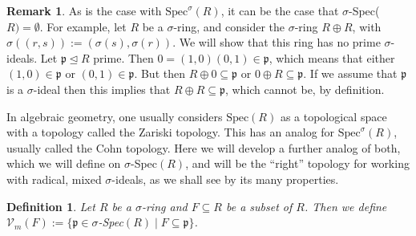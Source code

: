\documentclass{article}
\def\I{\mathbb{I}}
\def\Vm{\mathcal{V}_m}
\def\p{\mathfrak{p}}
\def\s{\sigma}
\def\Spec{\text{Spec}}
\theoremstyle{plain}
\newtheorem{defn}[Satz]{Definition}
\theoremstyle{definition}
\newtheorem{rem}[Satz]{Remark}
\begin{document}
\begin{rem}
As is the case with $\Spec^\s(R)$, it can be the case that $\s$-Spec($R)= \emptyset$. For example, let $R$ be a $\s$-ring, and consider the $\s$-ring $R \oplus R$, with $\s( (r,s)):= (\s(s),\s(r))$. 
We will show that this ring has no prime $\s$-ideals. Let $\p \unlhd R$ prime. Then $0 = (1,0)(0,1) \in \p$, which means that either $(1,0) \in \p$ or $(0,1) \in \p$. But then $R \oplus 0 \subseteq \p$ or $0 \oplus R \subseteq \p$. If we assume that $\p$ is a $\s$-ideal then
 this implies that $R \oplus R \subseteq \p$, which cannot be, by definition.
\end{rem}

In algebraic geometry, one usually considers $\Spec(R)$ as a topological space with a topology called the Zariski topology. This has an analog for $\Spec^\s(R)$, usually called the Cohn topology. Here we will develop a further analog of both,
 which we will define on $\s$-Spec$(R)$, and will be the ``right'' topology for working with radical, mixed $\s$-ideals, as we shall see by its many properties.

\begin{defn}
Let $R$ be a $\s$-ring and $F \subseteq R$ be a subset of $R$. Then we define $\Vm (F):= \{ \p \in \s$-Spec$(R) \mid F \subseteq \p \}$. 
\end{defn}
\end{document}
